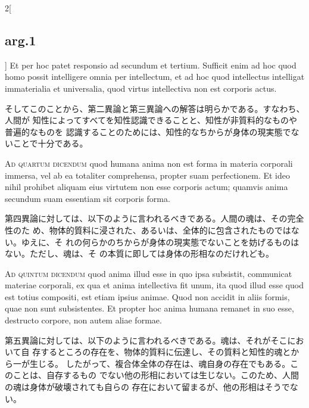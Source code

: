 \documentclass[paper=a4paper,fontsize=10pt,jafontsize=9pt,titlepage]{jlreq}
\begin{document}
\begin{paracol}{2}[\subsection{arg.1}]
 Et per hoc patet responsio ad secundum et tertium. Sufficit enim ad hoc quod
 homo possit intelligere omnia per intellectum, et ad hoc quod intellectus
 intelligat immaterialia et universalia, quod virtus intellectiva non est
 corporis actus.

 
\switchcolumn

 そしてこのことから、第二異論と第三異論への解答は明らかである。すなわち、人間が
 知性によってすべてを知性認識できることと、知性が非質料的なものや普遍的なものを
 認識することのためには、知性的なちからが身体の現実態でないことで十分である。
 
\switchcolumn*[\subsection{ad 4}]


{\scshape Ad quartum dicendum} quod humana anima non est forma in materia
corporali immersa, vel ab ea totaliter comprehensa, propter suam
perfectionem. Et ideo nihil prohibet aliquam eius virtutem non esse corporis
actum; quamvis anima secundum suam essentiam sit corporis forma.
 
\switchcolumn

 第四異論に対しては、以下のように言われるべきである。人間の魂は、その完全性のた
 め、物体的質料に浸された、あるいは、全体的に包含されたものではない。ゆえに、そ
 れの何らかのちからが身体の現実態でないことを妨げるものはない。ただし、魂は、そ
 の本質に即しては身体の形相なのだけれども。

 
\switchcolumn*[\subsection{ad 5}]

{\scshape Ad quintum dicendum} quod anima illud esse in quo ipsa subsistit,
 communicat materiae corporali, ex qua et anima intellectiva fit unum, ita quod
 illud esse quod est totius compositi, est etiam ipsius animae. Quod non accidit
 in aliis formis, quae non sunt subsistentes. Et propter hoc anima humana
 remanet in suo esse, destructo corpore, non autem aliae formae.
 
\switchcolumn

 第五異論に対しては、以下のように言われるべきである。魂は、それがそこにおいて自
 存するところの存在を、物体的質料に伝達し、その質料と知性的魂とから一が生じる。
 したがって、複合体全体の存在は、魂自身の存在でもある。このことは、自存するもの
 でない他の形相においては生じない。このため、人間の魂は身体が破壊されても自らの
 存在において留まるが、他の形相はそうでない。
 

\end{paracol}
\end{document}
